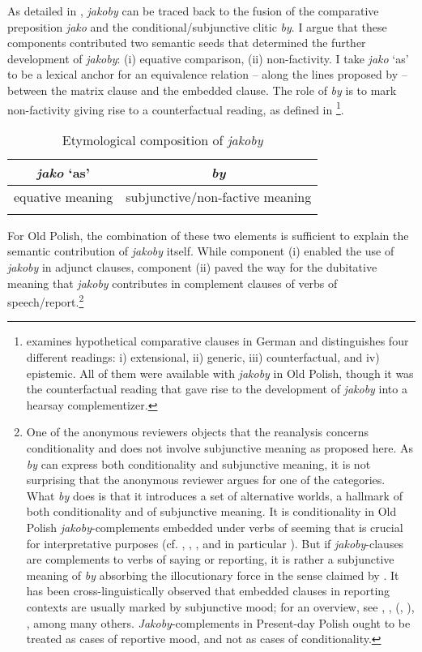 \documentclass[output=paper]{langsci/langscibook}
\begin{document}
As detailed in , \emph{jakoby} can be traced back to the fusion of the comparative preposition \emph{jako} and the conditional\slash subjunctive clitic \emph{by}. I argue that these components contributed two semantic seeds that determined the further development of \emph{jakoby}: (i) equative comparison, (ii) non-factivity. I take \emph{jako} `as' to be a lexical anchor for an equivalence relation – along the lines proposed by \textcite{Umbach-Gust2014} – between the matrix clause and the embedded clause. The role of \emph{by} is to mark non-factivity giving rise to a counterfactual reading, as defined in \textcite[988]{Bucking2017}\footnote{\textcite{Bucking2017} examines hypothetical comparative clauses in German and distinguishes four different readings: i) extensional, ii) generic, iii) counterfactual, and iv) epistemic. All of them were available with \emph{jakoby} in Old Polish, though it was the counterfactual reading that gave rise to the development of \emph{jakoby} into a hearsay complementizer.}.

\begin{table}[h]
\begin{tabular}{cc}
 \lsptoprule
 \emph{jako} `as' & \emph{by} \\
\midrule
equative meaning & subjunctive\slash non-factive meaning\\
 \lspbottomrule
\end{tabular}
\caption{Etymological composition of \emph{jakoby}\label{tab:jakoby:11}}
\end{table}

For Old Polish, the combination of these two elements is sufficient to explain the semantic contribution of \emph{jakoby} itself. While component (i) enabled the use of \emph{jakoby} in adjunct clauses, component (ii) paved the way for the dubitative meaning that \emph{jakoby} contributes in complement clauses of verbs of speech\slash report.\footnote{One of the anonymous reviewers objects that the reanalysis concerns conditionality and does not involve subjunctive meaning as proposed here.  As \emph{by} can express both conditionality and subjunctive meaning, it is not surprising that the anonymous reviewer argues for one of the categories. What \emph{by} does is that it introduces a set of alternative worlds, a hallmark of both conditionality and of subjunctive meaning. It is conditionality in Old Polish \emph{jakoby}-complements embedded under verbs of seeming that is crucial for interpretative purposes (cf. \citealt{Stalnaker1968}, \citealt{Lewis1973}, \citealt{Fintel2011}, and in particular \citealt{Bucking2017}). But if \emph{jakoby}-clauses are complements to verbs of saying or reporting, it is rather a subjunctive meaning of \emph{by} absorbing the illocutionary force in the sense claimed by \textcite{Truckenbrodt2006}. It has been cross-linguistically observed that embedded clauses in reporting contexts are usually marked by subjunctive mood; for an overview, see \textcite{Becker-Remberger2010}, \textcite{Fabricius-Hansen-Saebo2004}, \citeauthor{Portner1997} (\citeyear{Portner1997}, \citeyear{Portner2018}), \textcite{Sode2014}, among many others. \emph{Jakoby}-complements in Present-day Polish ought to be treated as cases of reportive mood, and not as cases of conditionality.}
\end{document}
